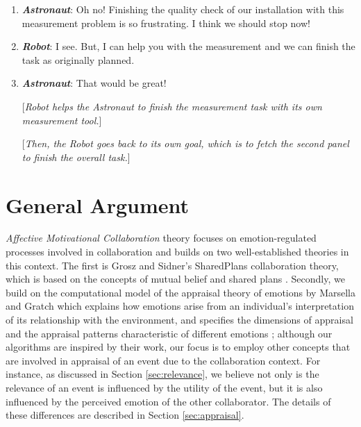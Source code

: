 \documentclass[12pt]{report}
\begin{document}
\begin{enumerate}
  \item \textit{\textbf{Astronaut}}: Oh no! Finishing the quality check of our
  installation with this measurement problem is so frustrating. I think we
  should stop now!

  \item \textit{\textbf{Robot}}: I see. But, I can help you with the measurement
  and we can finish the task as originally planned.

  \item \textit{\textbf{Astronaut}}: That would be great!

  [\textit{Robot helps the Astronaut to finish the measurement task with its
  own measurement tool.}]
  
  [\textit{Then, the Robot goes back to its own goal, which is to fetch the
  second panel to finish the overall task.}]

\end{enumerate}

\section{General Argument}

\textit{Affective Motivational Collaboration} theory focuses on
emotion-regulated processes involved in collaboration and builds on two
well-established theories in this context. The first is Grosz and Sidner's
SharedPlans collaboration theory, which is based on the concepts of mutual
belief and shared plans \cite{grosz:shared-plans, grosz:plans-discourse}.
Secondly, we build on the computational model of the appraisal theory of
emotions by Marsella and Gratch \cite{gratch:domain-independent,
gratch:evaluating, marsella:ema-process-model, marsella:computational} which
explains how emotions arise from an individual's interpretation of its
relationship with the environment, and specifies the dimensions of appraisal and
the appraisal patterns characteristic of different emotions
\cite{scherer:appraisal-processes}; although our algorithms are
inspired by their work, our focus is to employ other concepts that are
involved in appraisal of an event due to the collaboration context. For
instance, as discussed in Section \ref{sec:relevance}, we believe not only is
the relevance of an event is influenced by the utility of the event, but it is also
influenced by the perceived emotion of the other collaborator. The details of
these differences are described in Section \ref{sec:appraisal}.
\end{document}
